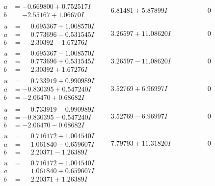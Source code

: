 \documentclass[1p]{elsarticle_modified}
\theoremstyle{definition}
\begin{document}
$$\begin{array}{c|c|c}
\begin{aligned}
a &= -0.669800 + 0.752517 I \\
b &= -2.55167 + 1.06670 I\end{aligned}
 & \phantom{-}6.81481 + 5.87899 I & \phantom{-0.000000 } 0 \\ \hline\begin{aligned}
u &= \phantom{-}0.695367 + 1.008570 I \\
a &= \phantom{-}0.773696 - 0.531545 I \\
b &= \phantom{-}2.30392 - 1.67276 I\end{aligned}
 & \phantom{-}3.26597 + 11.08620 I & \phantom{-0.000000 } 0 \\ \hline\begin{aligned}
u &= \phantom{-}0.695367 - 1.008570 I \\
a &= \phantom{-}0.773696 + 0.531545 I \\
b &= \phantom{-}2.30392 + 1.67276 I\end{aligned}
 & \phantom{-}3.26597 - 11.08620 I & \phantom{-0.000000 } 0 \\ \hline\begin{aligned}
u &= \phantom{-}0.733919 + 0.990989 I \\
a &= -0.830395 + 0.547240 I \\
b &= -2.06470 + 0.68682 I\end{aligned}
 & \phantom{-}3.52769 + 6.96997 I & \phantom{-0.000000 } 0 \\ \hline\begin{aligned}
u &= \phantom{-}0.733919 - 0.990989 I \\
a &= -0.830395 - 0.547240 I \\
b &= -2.06470 - 0.68682 I\end{aligned}
 & \phantom{-}3.52769 - 6.96997 I & \phantom{-0.000000 } 0 \\ \hline\begin{aligned}
u &= \phantom{-}0.716172 + 1.004540 I \\
a &= \phantom{-}1.061840 - 0.659607 I \\
b &= \phantom{-}2.20371 - 1.26389 I\end{aligned}
 & \phantom{-}7.79793 + 11.31820 I & \phantom{-0.000000 } 0 \\ \hline\begin{aligned}
u &= \phantom{-}0.716172 - 1.004540 I \\
a &= \phantom{-}1.061840 + 0.659607 I \\
b &= \phantom{-}2.20371 + 1.26389 I\end{aligned}

\end{array}$$
\end{document}
